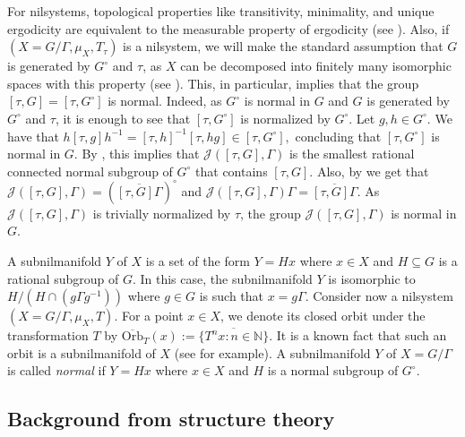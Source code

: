 \documentclass[letter, 11pt]{article}
\theoremstyle{definition}
\theoremstyle{plain}
\newcommand{\N}{\mathbb{N}}
\newcommand{\1}{\mathbbm{1}}
\begin{document}
For nilsystems, topological properties like transitivity, minimality, and unique ergodicity are equivalent to the measurable property of ergodicity (see {\cite{Parry_ergodic_affine_nil:1969,Lesigne_1991,Leibman05a,Host_Kra_nilpotent_structures_ergodic_theory:2018}}). Also, if $(X=G/\Gamma,\mu_X,T_\tau)$ is a nilsystem, we will make the standard assumption that $G$ is generated by $G^\circ$ and $\tau$, as $X$ can be decomposed into finitely many isomorphic spaces with this property (see \cite[Chapter 11, Section 1.2]{Host_Kra_nilpotent_structures_ergodic_theory:2018}). This, in particular, implies that the group $[\tau,G]=[\tau,G^\circ]$ is normal. Indeed, as $G^\circ$ is normal in $G$ and $G$ is generated by $G^\circ$ and $\tau$, it is enough to see that $[\tau,G^\circ]$ is normalized by $G^\circ$. Let $g,h\in G^\circ$. We have that $h[\tau,g]h^{-1}=[\tau,h]^{-1}[\tau,hg]\in [\tau,G^\circ], $ concluding that $[\tau,G^\circ]$ is normal in $G$. By \cite[Theorem 3.5]{GK-19}, this implies that $\mathcal{J}([\tau,G],\Gamma)$ is the smallest rational connected normal subgroup of $G^\circ$ that contains $[\tau,G]$. Also, by \cite[Proposition 3.4]{GK-19} we get that $\mathcal{J}([\tau,G],\Gamma)= (\overline{[\tau,G]\Gamma})^{\circ}$ and $\mathcal{J}([\tau,G],\Gamma)\Gamma=\overline{[\tau,G]\Gamma}$. As $\mathcal{J}([\tau,G],\Gamma)$ is trivially normalized by $\tau$, the group $\mathcal{J}([\tau,G],\Gamma)$ is normal in $G$. 




A subnilmanifold $Y$ of $X$ is a set of the form $Y=Hx$ where $x\in X$ and $H\subseteq G$ is a rational subgroup of $G$. In this case, the subnilmanifold $Y$ is isomorphic to $H/(H\cap (g\Gamma g^{-1}))$ where $g\in G$ is such that $x=g\Gamma$. Consider now a nilsystem $(X=G/\Gamma,\mu_X,T)$. For a point $x\in X$, we denote its closed orbit under the transformation $T$ by 
$\overline{\mathrm{Orb}}_T(x):=\overline{ \{T^n x : n\in \N \}}. $
It is a known fact that such an orbit is a subnilmanifold of $X$ (see \cite[Chapter 11]{Host_Kra_nilpotent_structures_ergodic_theory:2018} for example). A subnilmanifold $Y$ of $X=G/\Gamma$ is called \textit{normal} if $Y=Hx$ where $x\in X$ and $H$ is a normal subgroup of $G^{\circ}$.
 


\subsection{Background from structure theory}\label{sec-2.15}
\end{document}
